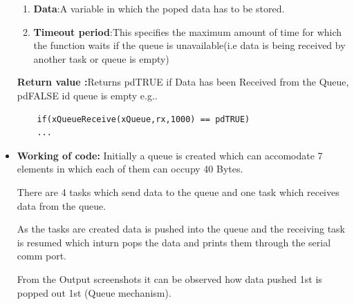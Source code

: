 \documentclass[11pt,a4paper]{article}
\begin{document}
\begin{itemize}
\begin{enumerate}
		\item\textbf{Data}:A variable in which the poped data has to be stored.
		
		\item\textbf{Timeout period}:This specifies the maximum amount of time for which the function waits if the queue is unavailable(i.e data is being received by another task or queue is empty) 
		\newline		
	\end{enumerate}
	\textbf{Return value :}Returns pdTRUE if Data has been Received from the Queue, pdFALSE id queue is empty e.g..
	\begin{lstlisting}
	if(xQueueReceive(xQueue,rx,1000) == pdTRUE)
	...
	\end{lstlisting}
	
	\item\textbf{Working of code:}
	Initially a queue is created which can accomodate 7 elements in which each of them can occupy 40 Bytes.
	
	There are 4 tasks which send data to the queue and one task which receives data from the queue.
	
	As the tasks are created data is pushed into the queue and the receiving task is resumed which inturn pops the data and prints them through the serial comm port.
	
	From the Output screenshots it can be observed how  data pushed 1st is popped out 1st (Queue mechanism).  
	\end{itemize}
\end{document}
